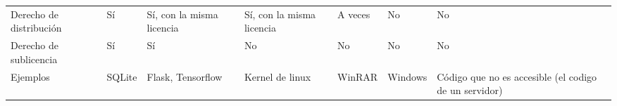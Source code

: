 \begin{table}[]
\begin{tabular}{@{}lllllll@{}}
Derecho de distribución         & Sí              & Sí, con la misma licencia                       & Sí, con la misma licencia                          & A veces                                                                                                 & No                   & No                                                    \\
Derecho de sublicencia          & Sí              & Sí                                              & No                                                 & No                                                                                                      & No                   & No                                                    \\
Ejemplos                        & SQLite          & Flask, Tensorflow                               & Kernel de linux                                    & WinRAR                                                                                                  & Windows              & Código que no es accesible (el codigo de un servidor) \\ \bottomrule
\end{tabular}
\end{table}


